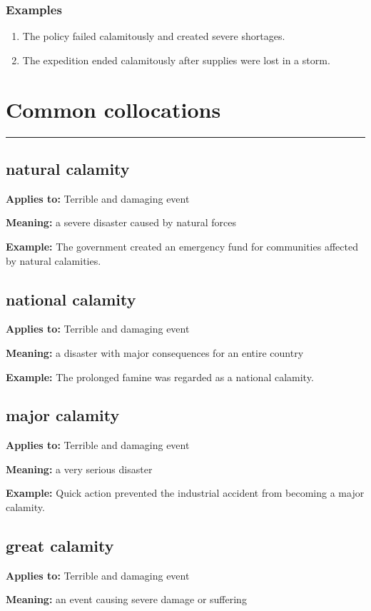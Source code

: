 \documentclass[11pt]{article}
\newcommand{\sectionrule}{\par\vspace{-0.5em}\noindent\textcolor{Accent}{\rule{\linewidth}{0.6pt}}\par}
\begin{document}
\subsubsection{Examples}
\begin{enumerate}
  \item The policy failed calamitously and created severe shortages.
  \item The expedition ended calamitously after supplies were lost in a storm.
\end{enumerate}

\section{Common collocations}
\sectionrule
\subsection{natural calamity}
\textbf{Applies to:} Terrible and damaging event

\textbf{Meaning:} a severe disaster caused by natural forces

\textbf{Example:} The government created an emergency fund for communities affected by natural calamities.

\subsection{national calamity}
\textbf{Applies to:} Terrible and damaging event

\textbf{Meaning:} a disaster with major consequences for an entire country

\textbf{Example:} The prolonged famine was regarded as a national calamity.

\subsection{major calamity}
\textbf{Applies to:} Terrible and damaging event

\textbf{Meaning:} a very serious disaster

\textbf{Example:} Quick action prevented the industrial accident from becoming a major calamity.

\subsection{great calamity}
\textbf{Applies to:} Terrible and damaging event

\textbf{Meaning:} an event causing severe damage or suffering
\end{document}
